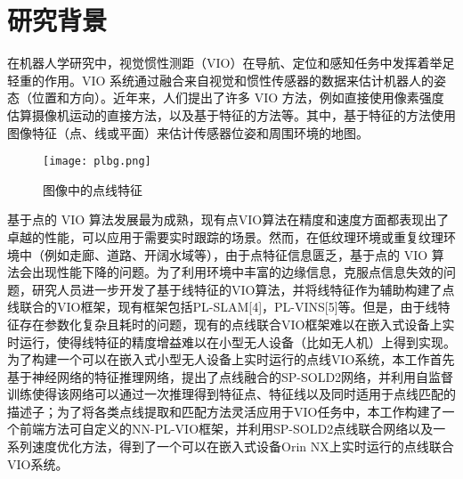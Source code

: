 
\chapter{研究背景}
\label{background}
在机器人学研究中，视觉惯性测距（VIO）在导航、定位和感知任务中发挥着举足轻重的作用。VIO 系统通过融合来自视觉和惯性传感器的数据来估计机器人的姿态（位置和方向）。近年来，人们提出了许多 VIO 方法，例如直接使用像素强度估算摄像机运动的直接方法，以及基于特征的方法等。其中，基于特征的方法使用图像特征（点、线或平面）来估计传感器位姿和周围环境的地图。
\begin{figure}
  \centering
  \texttt{[image: plbg.png]}
  \label{fig_plbg}
  \caption{图像中的点线特征}
\end{figure}
基于点的 VIO 算法发展最为成熟，现有点VIO算法在精度和速度方面都表现出了卓越的性能，可以应用于需要实时跟踪的场景。然而，在低纹理环境或重复纹理环境中（例如走廊、道路、开阔水域等），由于点特征信息匮乏，基于点的 VIO 算法会出现性能下降的问题。为了利用环境中丰富的边缘信息，克服点信息失效的问题，研究人员进一步开发了基于线特征的VIO算法，并将线特征作为辅助构建了点线联合的VIO框架，现有框架包括PL-SLAM[4]，PL-VINS[5]等。但是，由于线特征存在参数化复杂且耗时的问题，现有的点线联合VIO框架难以在嵌入式设备上实时运行，使得线特征的精度增益难以在小型无人设备（比如无人机）上得到实现。 为了构建一个可以在嵌入式小型无人设备上实时运行的点线VIO系统，本工作首先基于神经网络的特征推理网络，提出了点线融合的SP-SOLD2网络，并利用自监督训练使得该网络可以通过一次推理得到特征点、特征线以及同时适用于点线匹配的描述子；为了将各类点线提取和匹配方法灵活应用于VIO任务中，本工作构建了一个前端方法可自定义的NN-PL-VIO框架，并利用SP-SOLD2点线联合网络以及一系列速度优化方法，得到了一个可以在嵌入式设备Orin NX上实时运行的点线联合VIO系统。

